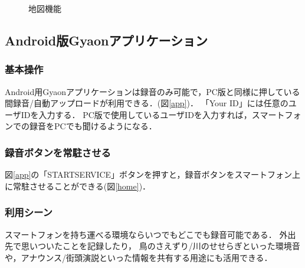 \begin{figure}[H]
\centering
{}
\caption{地図機能}
\label{map}
\end{figure}


\subsection{Android版Gyaonアプリケーション}

\subsubsection{基本操作}
Android用Gyaonアプリケーションは録音のみ可能で，PC版と同様に押している間録音/自動アップロードが利用できる．(図\ref{app})．
「Your ID」には任意のユーザIDを入力する．
PC版で使用しているユーザIDを入力すれば，スマートフォンでの録音をPCでも聞けるようになる．

\subsubsection{録音ボタンを常駐させる}
図\ref{app}の「STARTSERVICE」ボタンを押すと，録音ボタンをスマートフォン上に常駐させることができる(図\ref{home})．

\subsubsection{利用シーン}
スマートフォンを持ち運べる環境ならいつでもどこでも録音可能である．
外出先で思いついたことを記録したり，
鳥のさえずり/川のせせらぎといった環境音や，アナウンス/街頭演説といった情報を共有する用途にも活用できる．


